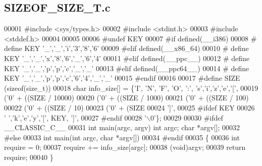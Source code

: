 \subsection{S\+I\+Z\+E\+O\+F\+\_\+\+S\+I\+Z\+E\+\_\+\+T.\+c}
\label{SIZEOF__SIZE__T_8c_source}

\begin{DoxyCode}
00001 \textcolor{preprocessor}{#include <sys/types.h>}
00002 \textcolor{preprocessor}{#include <stdint.h>}
00003 \textcolor{preprocessor}{#include <stddef.h>}
00004 
00005 
00006 \textcolor{preprocessor}{#undef KEY}
00007 \textcolor{preprocessor}{#if defined(\_\_i386)}
00008 \textcolor{preprocessor}{# define KEY '\_','\_','i','3','8','6'}
00009 \textcolor{preprocessor}{#elif defined(\_\_x86\_64)}
00010 \textcolor{preprocessor}{# define KEY '\_','\_','x','8','6','\_','6','4'}
00011 \textcolor{preprocessor}{#elif defined(\_\_ppc\_\_)}
00012 \textcolor{preprocessor}{# define KEY '\_','\_','p','p','c','\_','\_'}
00013 \textcolor{preprocessor}{#elif defined(\_\_ppc64\_\_)}
00014 \textcolor{preprocessor}{# define KEY '\_','\_','p','p','c','6','4','\_','\_'}
00015 \textcolor{preprocessor}{#endif}
00016 
00017 \textcolor{preprocessor}{#define SIZE (sizeof(size\_t))}
00018 \textcolor{keywordtype}{char} info_size[] =  \{\textcolor{charliteral}{'I'}, \textcolor{charliteral}{'N'}, \textcolor{charliteral}{'F'}, \textcolor{charliteral}{'O'}, \textcolor{charliteral}{':'}, \textcolor{charliteral}{'s'},\textcolor{charliteral}{'i'},\textcolor{charliteral}{'z'},\textcolor{charliteral}{'e'},\textcolor{charliteral}{'['},
00019   (\textcolor{charliteral}{'0'} + ((SIZE / 10000)%
00020   (\textcolor{charliteral}{'0'} + ((SIZE / 1000)%
00021   (\textcolor{charliteral}{'0'} + ((SIZE / 100)%
00022   (\textcolor{charliteral}{'0'} + ((SIZE / 10)%
00023   (\textcolor{charliteral}{'0'} +  (SIZE    %
00024   \textcolor{charliteral}{']'},
00025 \textcolor{preprocessor}{#ifdef KEY}
00026   \textcolor{charliteral}{' '},\textcolor{charliteral}{'k'},\textcolor{charliteral}{'e'},\textcolor{charliteral}{'y'},\textcolor{charliteral}{'['}, KEY, \textcolor{charliteral}{']'},
00027 \textcolor{preprocessor}{#endif}
00028   \textcolor{charliteral}{'\(\backslash\)0'}\};
00029 
00030 \textcolor{preprocessor}{#ifdef \_\_CLASSIC\_C\_\_}
00031 \textcolor{keywordtype}{int} main(argc, argv) \textcolor{keywordtype}{int} argc; \textcolor{keywordtype}{char} *argv[];
00032 \textcolor{preprocessor}{#else}
00033 \textcolor{keywordtype}{int} main(\textcolor{keywordtype}{int} argc, \textcolor{keywordtype}{char} *argv[])
00034 \textcolor{preprocessor}{#endif}
00035 \{
00036   \textcolor{keywordtype}{int} require = 0;
00037   require += info_size[argc];
00038   (void)argv;
00039   \textcolor{keywordflow}{return} require;
00040 \}
\end{DoxyCode}
